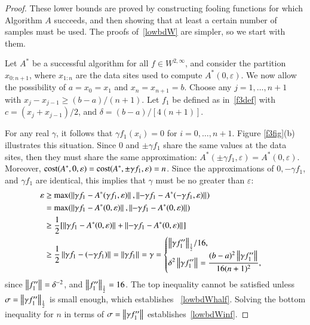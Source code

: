 \documentclass[review]{elsarticle}
\newcommand{\abstol}{\varepsilon}
\theoremstyle{definition}
\renewcommand{\cw}{W}
\begin{document}
\begin{proof}
	These lower bounds are proved by constructing fooling functions for which
	Algorithm $A$ succeeds, and then showing that at least a certain number of
	samples must be used. The proofs of~\eqref{lowbdW} are simpler, so
	we start with them.
		
	Let $A^*$ be a successful algorithm for all $f \in \cw^{2,\infty}$, and consider
	the partition $x_{0:n+1}$, where $x_{1:n}$ are the data sites
	used to compute $A^*(0,\abstol)$.  We now allow the possibility of $a = x_0=x_1$
	and $x_n = x_{n+1} = b$. Choose any $j=1, \ldots, n+1$ with
	$x_j-x_{j-1} \ge (b-a)/(n+1)$. Let $f_1$ be defined as in~\eqref{f3def} with $c
	= (x_j+x_{j-1})/2$, and $\delta = (b-a)/[4(n+1)]$.
	
	For any real $\gamma$, it follows that $\gamma f_1(x_i)=0$ for $i=0, \ldots,
	n+1$. Figure \ref{f3fig}(b) illustrates this situation. Since $0$ and $\pm
	\gamma f_1$ share the same values at the data sites, then they must share the
	same approximation: $A^*(\pm \gamma f_1,\abstol) = A^*(0,\abstol)$. Moreover,
	$\cost(A^*,0,\abstol) = \cost(A^*,\pm \gamma f_1,\abstol) = n$. Since the
	approximations of $0, -\gamma f_1$, and $\gamma f_1$ are identical, this implies that
	$\gamma$
	must be no greater than $\abstol$:
	\begin{align*}
	\abstol  &\ge \max(\norm{\gamma f_1 - A^*(\gamma f_1,\abstol)},
	\norm{-\gamma f_1 - A^*(-\gamma f_1,\abstol)}) \\
	&= \max(\norm{\gamma f_1 - A^*(0,\abstol)}, \norm{-\gamma f_1 - A^*(0,\abstol)}) \\
	& \ge \frac{1}{2} [\norm{\gamma f_1 - A^*(0,\abstol)}
	+ \norm{-\gamma f_1 - A^*(0,\abstol)}] \\
	& \ge \frac{1}{2} \norm{\gamma f_1 - (-\gamma f_1)} =  \norm{\gamma f_1}
	= \gamma %
	= \begin{cases} \displaystyle { \norm[\frac 12]{\gamma f_1''}}/{16} , \\
	\displaystyle \delta^2 	\norm{\gamma f_1''}
	=  \frac{(b-a)^2 \norm{\gamma f_1''}}{16(n+1)^2},
	\end{cases}
	\end{align*}
	since $\norm{f_1''} =  \delta^{-2}$,  and $\norm[\frac 12]{f_1''} = 16$. The top inequality
	cannot be satisfied unless $\sigma = \norm[\frac 12]{\gamma
	f_1''}$ is small enough, which establishes ~\eqref{lowbdWhalf}. Solving the
	bottom inequality for $n$ in terms of $\sigma = \norm{\gamma f_1''}$
	establishes~\eqref{lowbdWinf}.



\end{proof}
\end{document}
